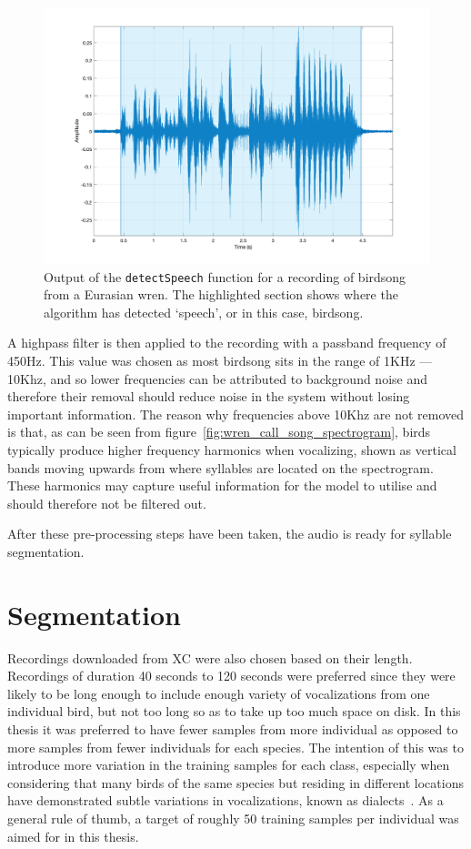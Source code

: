 \begin{figure}[ht]
  \centering
  \includegraphics[width=\textwidth]{figures/detected_speech.png}
  \caption{Output of the \texttt{detectSpeech} function for a recording of
  birdsong from a Eurasian wren. The highlighted section shows where the
algorithm has detected `speech', or in this case,
birdsong.}\label{fig:detected_speech}
\end{figure}

A highpass filter is then applied to the recording with a passband frequency of
450Hz. This value was chosen as most birdsong sits in the range of 1KHz ---
10Khz, and so lower frequencies can be attributed to background noise and
therefore their removal should reduce noise in the system without losing
important information. The reason why frequencies above 10Khz are not removed
is that, as can be seen from figure~\ref{fig:wren_call_song_spectrogram}, birds
typically produce higher frequency harmonics when vocalizing, shown as vertical
bands moving upwards from where syllables are located on the spectrogram. These
harmonics may capture useful information for the model to utilise
and should therefore not be filtered out.

After these pre-processing steps have been taken, the audio is ready for
syllable segmentation.

\section{Segmentation}\label{sec:segmentation}

Recordings downloaded from XC were also chosen based on their length. Recordings
of duration 40 seconds to 120 seconds were preferred since they were likely to
be long enough to include enough variety of vocalizations from one individual
bird, but not too long so as to take up too much space on disk. In this thesis
it was preferred to have fewer samples from more individual as opposed to more
samples from fewer individuals for each species. The intention of this was to
introduce more variation in the training samples for each class, especially when
considering that many birds of the same species but residing in different
locations have demonstrated subtle variations in vocalizations, known as
dialects~\cite{baker1985biology}. As a general rule of thumb, a target of
roughly 50 training samples per individual was aimed for in this thesis.

